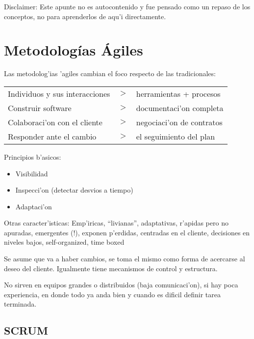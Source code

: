 \documentclass[a4paper,spanish]{article}
\newenvironment{items}{
		\vspace*{-\topsep}
		\begin{itemize} 
		\addtolength{\itemsep}{-0.5\baselineskip}
		}{\end{itemize}\vspace*{-\topsep}}
\begin{document}
Disclaimer: Este apunte no es autocontenido y fue pensado como un repaso de los conceptos, 
no para aprenderlos de aqu'i directamente.

\section{Metodolog\'ias \'Agiles}

Las metodolog'ias 'agiles cambian el foco respecto de las tradicionales:\\
\begin{tabular}{lcl}
Individuos y sus interacciones &$>$& herramientas + procesos \\
Construir software &$>$& documentaci'on completa \\
Colaboraci'on con el cliente &$>$& negociaci'on de contratos \\
Responder ante el cambio &$>$& el seguimiento del plan
\end{tabular}

Principios b'asicos:
\begin{items}
\item Visibilidad
\item Inspecci'on (detectar desvios a tiempo)
\item Adaptaci'on
\end{items}

Otras caracter'isticas: Emp'iricas, ``livianas'', adaptativas, r'apidas pero
	no apuradas, emergentes (!), exponen p'erdidas, centradas en el cliente,
	decisiones en niveles bajos, self-organized, time boxed

Se asume que va a haber cambios, se toma el mismo como forma de acercarse al
deseo del cliente. Igualmente tiene mecanismos de control y estructura.

No sirven en equipos grandes o distribuidos (baja comunicaci'on), si hay poca
	experiencia, en donde todo ya anda bien y cuando es dificil definir tarea
	terminada.

\subsection{SCRUM}
\end{document}
